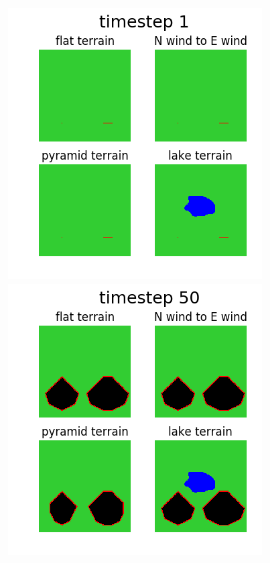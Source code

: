 \documentclass{article}
\begin{document}
\begin{figure}
\includegraphics[width=0.6\textwidth]{multi_im000.png} \includegraphics[width=0.6\textwidth]{multi_im049.png}

\end{figure}
\end{document}
